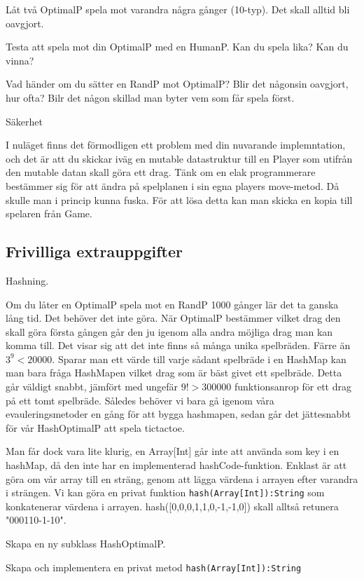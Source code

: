 \Subtask Låt två OptimalP spela mot varandra några gånger (10-typ). Det skall alltid bli oavgjort.

\Subtask Testa att spela mot din OptimalP med en HumanP. Kan du spela lika? Kan du vinna?

\Subtask Vad händer om du sätter en RandP mot OptimalP? Blir det någonsin oavgjort, hur ofta? Bilr det någon skillad man byter vem som får spela först.

\Task Säkerhet

I nuläget finns det förmodligen ett problem med din nuvarande implemntation, och det är att du skickar iväg en mutable datastruktur till en Player som utifrån den mutable datan skall göra ett drag. Tänk om en elak programmerare bestämmer sig för att ändra på spelplanen i sin egna players move-metod. Då skulle man i princip kunna fuska. För att lösa detta kan man skicka en kopia till spelaren från Game.

\subsection{Frivilliga extrauppgifter}

\Task Hashning.

Om du låter en OptimalP spela mot en RandP 1000 gånger lär det ta ganska lång tid. Det behöver det inte göra. När OptimalP bestämmer vilket drag den skall göra första gången går den ju igenom alla andra möjliga drag man kan komma till. Det visar sig att det inte finns så många unika spelbräden. Färre än $3^9 < 20000$. Sparar man ett värde till varje sådant spelbräde i en HashMap kan man bara fråga HashMapen vilket drag som är bäst givet ett spelbräde. Detta går väldigt snabbt, jämfört med ungefär $9! > 300000$ funktionsanrop för ett drag på ett tomt spelbräde. Således behöver vi bara gå igenom våra evauleringsmetoder en gång för att bygga hashmapen, sedan går det jättesnabbt för vår HashOptimalP att spela tictactoe. 

Man får dock vara lite klurig, en Array[Int] går inte att använda som key i en hashMap, då den inte har en implementerad hashCode-funktion. Enklast är att göra om vår array till en sträng, genom att lägga värdena i arrayen efter varandra i strängen. Vi kan göra en privat funktion \texttt{hash(Array[Int]):String} som konkatenerar värdena i arrayen. hash([0,0,0,1,1,0,-1,-1,0]) skall alltså retunera "000110-1-10".

\Subtask Skapa en ny subklass HashOptimalP.

\Subtask Skapa och implementera en privat metod \texttt{hash(Array[Int]):String}

